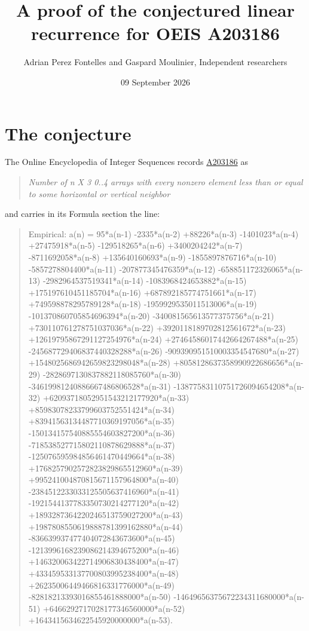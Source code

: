 \documentclass[11pt]{article}
\title{A proof of the conjectured linear recurrence for OEIS A203186}
\author{Adrian Perez Fontelles and Gaspard Moulinier, Independent researchers}
\date{09 September 2026}
\theoremstyle{definition}
\begin{document}
\maketitle
\section{The conjecture}

The Online Encyclopedia of Integer Sequences records \href{https://oeis.org/A203186}{A203186} as

\begin{quote}\itshape Number of n X 3 0..4 arrays with every nonzero element less than or equal to some horizontal or vertical neighbor\end{quote}

and carries in its Formula section the line:

\begin{quote}\ttfamily Empirical: a(n) = 95*a(n-1) -2335*a(n-2) +88226*a(n-3) -1401023*a(n-4) +27475918*a(n-5) -129518265*a(n-6) +3400204242*a(n-7) -8711692058*a(n-8) +135640160693*a(n-9) -1855897876716*a(n-10) -5857278804400*a(n-11) -207877345476359*a(n-12) -658851172326065*a(n-13) -2982964537519341*a(n-14) -1083968424653882*a(n-15) +175197610451185704*a(n-16) +687892185774751661*a(n-17) +749598878295789128*a(n-18) -1959929535011513006*a(n-19) -101370860705854696394*a(n-20) -340081565613577375756*a(n-21) +730110761278751037036*a(n-22) +3920118189702812561672*a(n-23) +12619795867291127254976*a(n-24) +27464586017442664267488*a(n-25) -245687729406837440328288*a(n-26) -909390951510003354547680*a(n-27) +1548025686942659823298048*a(n-28) +8058128637358990922686656*a(n-29) -2828697130837882118085760*a(n-30) -34619981240886667486806528*a(n-31) -13877583110751726094654208*a(n-32) +62093718052951543212177920*a(n-33) +85983078233799603752551424*a(n-34) +83941563134487710369197056*a(n-35) -150134157540885554603827200*a(n-36) -718538527715802110878629888*a(n-37) -125076595984856461470449664*a(n-38) +1768257902572823829865512960*a(n-39) +995241004870815671157964800*a(n-40) -2384512233033125505637416960*a(n-41) -1921544137783350730214277120*a(n-42) +1893287364220246513759027200*a(n-43) +1987808550619888781399162880*a(n-44) -836639937477404072843673600*a(n-45) -1213996168239086214394675200*a(n-46) +146320063422714906830438400*a(n-47) +433459533137700803995238400*a(n-48) +26235006449466816331776000*a(n-49) -82818213393016855461888000*a(n-50) -14649656375672234311680000*a(n-51) +6466292717028177346560000*a(n-52) +1643415634622545920000000*a(n-53).\end{quote}
\end{document}
